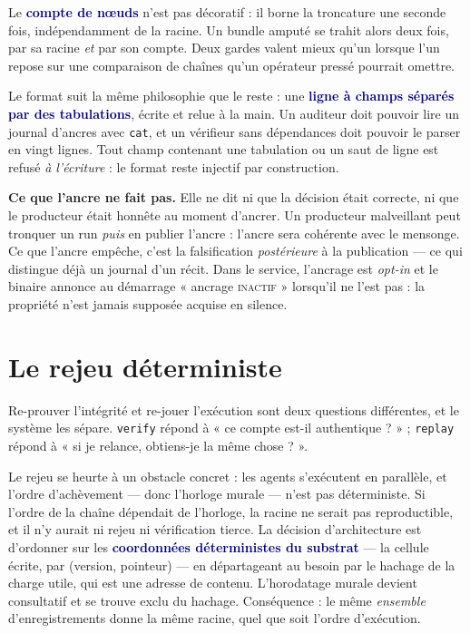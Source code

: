 \documentclass[10pt]{article}
\newcommand{\code}[1]{\texttt{\small #1}}
\newcommand{\mm}[1]{\textbf{\textcolor{navy}{#1}}}
\newcommand{\att}[1]{\textcolor{amber}{\textbf{#1}}}
\begin{document}
Le \mm{compte de nœuds} n'est pas décoratif : il borne la troncature une seconde fois, indépendamment de la racine. Un bundle amputé se trahit alors deux fois, par sa racine \emph{et} par son compte. Deux gardes valent mieux qu'un lorsque l'un repose sur une comparaison de chaînes qu'un opérateur pressé pourrait omettre.

Le format suit la même philosophie que le reste : une \mm{ligne à champs séparés par des tabulations}, écrite et relue à la main. Un auditeur doit pouvoir lire un journal d'ancres avec \code{cat}, et un vérifieur sans dépendances doit pouvoir le parser en vingt lignes. Tout champ contenant une tabulation ou un saut de ligne est refusé \emph{à l'écriture} : le format reste injectif par construction.

\att{Ce que l'ancre ne fait pas.} Elle ne dit ni que la décision était correcte, ni que le producteur était honnête au moment d'ancrer. Un producteur malveillant peut tronquer un run \emph{puis} en publier l'ancre : l'ancre sera cohérente avec le mensonge. Ce que l'ancre empêche, c'est la falsification \emph{postérieure} à la publication — ce qui distingue déjà un journal d'un récit. Dans le service, l'ancrage est \emph{opt-in} et le binaire annonce au démarrage « ancrage \textsc{inactif} » lorsqu'il ne l'est pas : la propriété n'est jamais supposée acquise en silence.

\section{Le rejeu déterministe}

Re-prouver l'intégrité et re-jouer l'exécution sont deux questions différentes, et le système les sépare. \code{verify} répond à « ce compte est-il authentique ? » ; \code{replay} répond à « si je relance, obtiens-je la même chose ? ».

Le rejeu se heurte à un obstacle concret : les agents s'exécutent en parallèle, et l'ordre d'achèvement — donc l'horloge murale — n'est pas déterministe. Si l'ordre de la chaîne dépendait de l'horloge, la racine ne serait pas reproductible, et il n'y aurait ni rejeu ni vérification tierce. La décision d'architecture est d'ordonner sur les \mm{coordonnées déterministes du substrat} — la cellule écrite, par (version, pointeur) — en départageant au besoin par le hachage de la charge utile, qui est une adresse de contenu. L'horodatage murale devient consultatif et se trouve exclu du hachage. Conséquence : le même \emph{ensemble} d'enregistrements donne la même racine, quel que soit l'ordre d'exécution.
\end{document}
